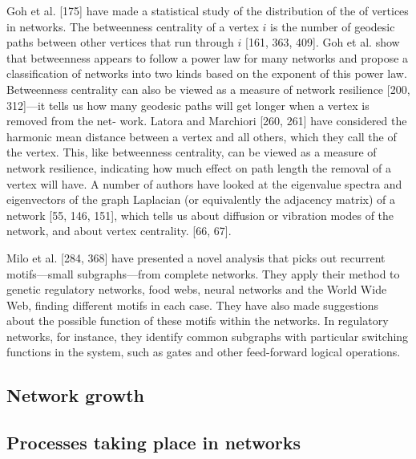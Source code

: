       Goh et al. [175] have made a statistical study of the distribution of the  of vertices in networks. The betweenness centrality of a vertex $i$ is the number of geodesic paths between other vertices that run through $i$ [161, 363, 409]. Goh et al. show that betweenness appears to follow a power law for many networks and propose a classification of networks into two kinds based on the exponent of this power law. Betweenness centrality can also be viewed as a measure of network resilience [200, 312]—it tells us how many geodesic paths will get longer when a vertex is removed from the net- work. Latora and Marchiori [260, 261] have considered the harmonic mean distance between a vertex and all others, which they call the  of the vertex. This, like betweenness centrality, can be viewed as a measure of network resilience, indicating how much effect on path length the removal of a vertex will have. A number of authors have looked at the eigenvalue spectra and eigenvectors of the graph Laplacian (or equivalently the adjacency matrix) of a network [55, 146, 151], which tells us about diffusion or vibration modes of the network, and about vertex centrality. [66, 67].
      
      Milo et al. [284, 368] have presented a novel analysis that picks out recurrent motifs—small subgraphs—from complete networks. They apply their method to genetic regulatory networks, food webs, neural networks and the World Wide Web, finding different motifs in each case. They have also made suggestions about the possible function of these motifs within the networks. In regulatory networks, for instance, they identify common subgraphs with particular switching functions in the system, such as gates and other feed-forward logical operations.

  \subsection{Network growth}
    
  \subsection{Processes taking place in networks}